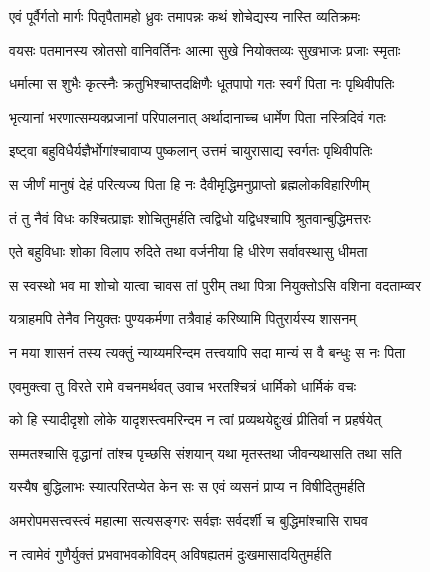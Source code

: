 \twolineshloka
{एवं पूर्वैर्गतो मार्गः पितृपैतामहो ध्रुवः}
{तमापन्नः कथं शोचेद्यस्य नास्ति व्यतिक्रमः} %

\twolineshloka
{वयसः पतमानस्य स्रोतसो वानिवर्तिनः}
{आत्मा सुखे नियोक्तव्यः सुखभाजः प्रजाः स्मृताः} %

\twolineshloka
{धर्मात्मा स शुभैः कृत्स्नैः क्रतुभिश्चाप्तदक्षिणैः}
{धूतपापो गतः स्वर्गं पिता नः पृथिवीपतिः} %

\twolineshloka
{भृत्यानां भरणात्सम्यक्प्रजानां परिपालनात्}
{अर्थादानाच्च धार्मेण पिता नस्त्रिदिवं गतः} %

\twolineshloka
{इष्ट्वा बहुविधैर्यज्ञैर्भोगांश्चावाप्य पुष्कलान्}
{उत्तमं चायुरासाद्य स्वर्गतः पृथिवीपतिः} %

\twolineshloka
{स जीर्णं मानुषं देहं परित्यज्य पिता हि नः}
{दैवीमृद्धिमनुप्राप्तो ब्रह्मलोकविहारिणीम्} %

\twolineshloka
{तं तु नैवं विधः कश्चित्प्राज्ञः शोचितुमर्हति}
{त्वद्विधो यद्विधश्चापि श्रुतवान्बुद्धिमत्तरः} %

\twolineshloka
{एते बहुविधाः शोका विलाप रुदिते तथा}
{वर्जनीया हि धीरेण सर्वावस्थासु धीमता} %

\twolineshloka
{स स्वस्थो भव मा शोचो यात्वा चावस तां पुरीम्}
{तथा पित्रा नियुक्तोऽसि वशिना वदताम्व्वर} %

\twolineshloka
{यत्राहमपि तेनैव नियुक्तः पुण्यकर्मणा}
{तत्रैवाहं करिष्यामि पितुरार्यस्य शासनम्} %

\twolineshloka
{न मया शासनं तस्य त्यक्तुं न्याय्यमरिन्दम}
{तत्त्वयापि सदा मान्यं स वै बन्धुः स नः पिता} %

\twolineshloka
{एवमुक्त्वा तु विरते रामे वचनमर्थवत्}
{उवाच भरतश्चित्रं धार्मिको धार्मिकं वचः} %

\twolineshloka
{को हि स्यादीदृशो लोके यादृशस्त्वमरिन्दम}
{न त्वां प्रव्यथयेद्दुःखं प्रीतिर्वा न प्रहर्षयेत्} %

\twolineshloka
{सम्मतश्चासि वृद्धानां तांश्च पृच्छसि संशयान्}
{यथा मृतस्तथा जीवन्यथासति तथा सति} %

\twolineshloka
{यस्यैष बुद्धिलाभः स्यात्परितप्येत केन सः}
{स एवं व्यसनं प्राप्य न विषीदितुमर्हति} %

\twolineshloka
{अमरोपमसत्त्वस्त्वं महात्मा सत्यसङ्गरः}
{सर्वज्ञः सर्वदर्शी च बुद्धिमांश्चासि राघव} %

\twolineshloka
{न त्वामेवं गुणैर्युक्तं प्रभवाभवकोविदम्}
{अविषह्यतमं दुःखमासादयितुमर्हति} %

